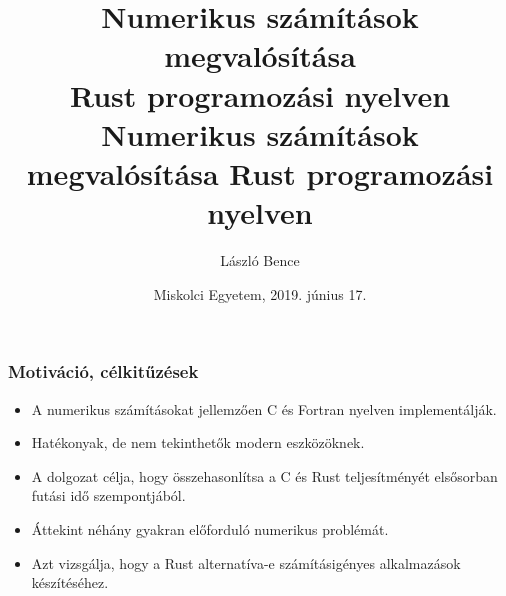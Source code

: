 \documentclass{beamer}
\begin{document}

\title[Numerikus számítások megvalósítása Rust programozási nyelven]{
{\Large Numerikus számítások megvalósítása \\ Rust programozási nyelven}
}
\title[Short Version]{Numerikus számítások megvalósítása Rust programozási nyelven}

\author[László Bence]{\Large László Bence}

\date{Miskolci Egyetem, 2019. június 17.}

\frame{\titlepage}

\begin{frame}[fragile]
\frametitle{Motiváció, célkitűzések}

\begin{itemize}
\item A numerikus számításokat jellemzően C és Fortran nyelven implementálják.
\item Hatékonyak, de nem tekinthetők modern eszközöknek.
\item A dolgozat célja, hogy összehasonlítsa a C és Rust teljesítményét elsősorban futási idő szempontjából.
\item Áttekint néhány gyakran előforduló numerikus problémát.
\item Azt vizsgálja, hogy a Rust alternatíva-e számításigényes alkalmazások készítéséhez.
\end{itemize}

\end{frame}
\end{document}
